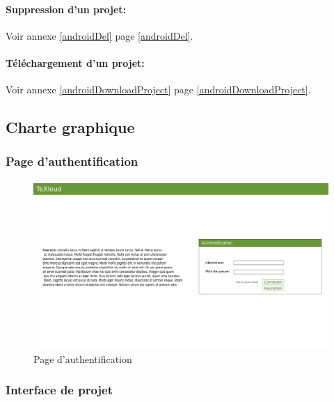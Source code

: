 \documentclass[a4paper,12pt]{article}
\begin{document}
\paragraph{Suppression d'un projet:\\}
Voir annexe \ref{androidDel} page \ref{androidDel}.

\paragraph{Téléchargement d'un projet:\\}
Voir annexe \ref{androidDownloadProject} page \ref{androidDownloadProject}.


\subsection{Charte graphique}
\subsubsection{Page d'authentification}
\paragraph{}
\begin{figure}[!ht]
\begin{center}
  \includegraphics[width=1\textwidth, angle=90]{../layout/layout_texloud_login.png}
\end{center}
  \caption{Page d'authentification}
  \label{uiAuth}
\end{figure}

\newpage
\subsubsection{Interface de projet}
\end{document}
